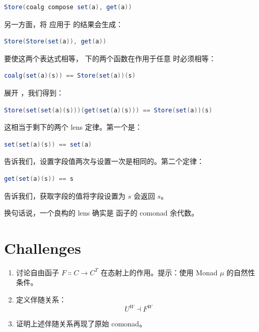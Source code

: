 \begin{lstlisting}[language=Scala]
Store(coalg compose set(a), get(a))
\end{lstlisting}
另一方面，将  应用于  的结果会生成：

\begin{lstlisting}[language=Scala]
Store(Store(set(a)), get(a))
\end{lstlisting}
要使这两个表达式相等， 下的两个函数在作用于任意  时必须相等：

\begin{lstlisting}[language=Scala]
coalg(set(a)(s)) == Store(set(a))(s)
\end{lstlisting}
展开 ，我们得到：

\begin{lstlisting}[language=Scala]
Store(set(set(a)(s)))(get(set(a)(s))) == Store(set(a))(s)
\end{lstlisting}
这相当于剩下的两个 lens 定律。第一个是：

\begin{lstlisting}[language=Scala]
set(set(a)(s)) == set(a)
\end{lstlisting}
告诉我们，设置字段值两次与设置一次是相同的。第二个定律：

\begin{lstlisting}[language=Scala]
get(set(a)(s)) == s
\end{lstlisting}
告诉我们，获取字段的值将字段设置为 $s$ 会返回 $s$。

换句话说，一个良构的 lens 确实是  函子的 comonad 余代数。

\section{Challenges}

\begin{enumerate}
  \tightlist
  \item
  讨论自由函子 $F \Colon C \to C^T$ 在态射上的作用。提示：使用 Monad $\mu$ 的自然性条件。
  \item
  定义伴随关系：
  \[U^W \dashv F^W\]
  \item
  证明上述伴随关系再现了原始 comonad。
\end{enumerate}
